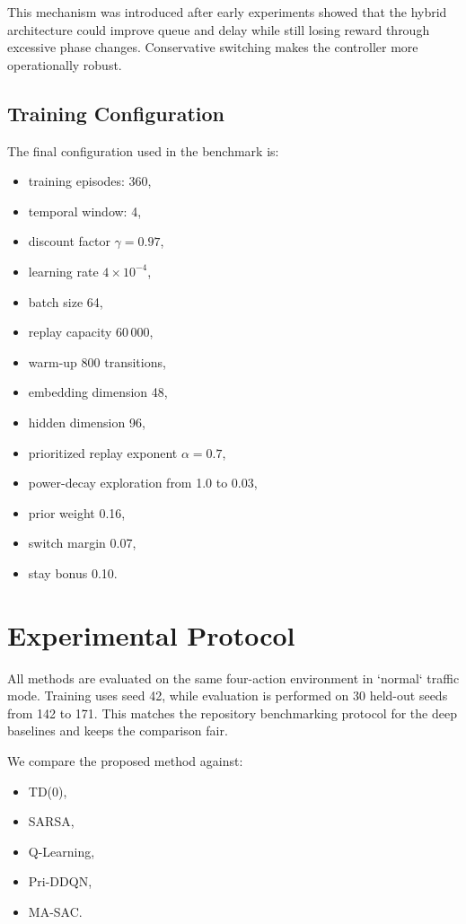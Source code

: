 \documentclass[conference]{IEEEtran}
\begin{document}
This mechanism was introduced after early experiments showed that the
hybrid architecture could improve queue and delay while still losing
reward through excessive phase changes. Conservative switching makes
the controller more operationally robust.

\subsection{Training Configuration}
The final configuration used in the benchmark is:

\begin{itemize}
\item training episodes: 360,
\item temporal window: 4,
\item discount factor $\gamma = 0.97$,
\item learning rate $4 \times 10^{-4}$,
\item batch size 64,
\item replay capacity 60\,000,
\item warm-up 800 transitions,
\item embedding dimension 48,
\item hidden dimension 96,
\item prioritized replay exponent $\alpha = 0.7$,
\item power-decay exploration from 1.0 to 0.03,
\item prior weight 0.16,
\item switch margin 0.07,
\item stay bonus 0.10.
\end{itemize}

\section{Experimental Protocol}
All methods are evaluated on the same four-action environment in
`normal` traffic mode. Training uses seed 42, while evaluation is
performed on 30 held-out seeds from 142 to 171. This matches the
repository benchmarking protocol for the deep baselines and keeps the
comparison fair.

We compare the proposed method against:

\begin{itemize}
\item TD(0),
\item SARSA,
\item Q-Learning,
\item Pri-DDQN,
\item MA-SAC.
\end{itemize}
\end{document}
